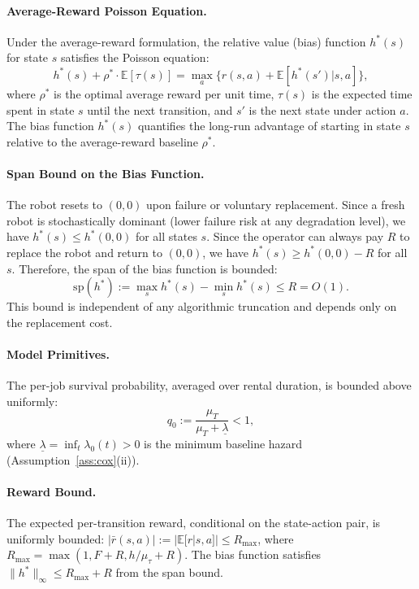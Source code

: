 \documentclass[letterpaper, 10 pt, conference]{IEEEconf}
\newcommand{\E}{\mathbb{E}}
\begin{document}
\paragraph{Average-Reward Poisson Equation.}
Under the average-reward formulation, the relative value (bias) function $h^*(s)$ for state $s$ satisfies the Poisson equation:
\begin{equation}
    \label{eq:poisson}
    h^*(s) + \rho^* \cdot \E[\tau(s)] = \max_a\Big\{r(s,a) + \E[h^*(s')|s,a]\Big\},
\end{equation}
where $\rho^*$ is the optimal average reward per unit time, $\tau(s)$ is the expected time spent in state $s$ until the next transition, and $s'$ is the next state under action $a$. The bias function $h^*(s)$ quantifies the long-run advantage of starting in state $s$ relative to the average-reward baseline $\rho^*$.

\paragraph{Span Bound on the Bias Function.}
The robot resets to $(0,0)$ upon failure or voluntary replacement. Since a fresh robot is stochastically dominant (lower failure risk at any degradation level), we have $h^*(s) \leq h^*(0,0)$ for all states $s$. Since the operator can always pay $R$ to replace the robot and return to $(0,0)$, we have $h^*(s) \geq h^*(0,0) - R$ for all $s$. Therefore, the span of the bias function is bounded:
\begin{equation}
    \label{eq:span_bound}
    \mathrm{sp}(h^*) := \max_s h^*(s) - \min_s h^*(s) \leq R = O(1).
\end{equation}
This bound is independent of any algorithmic truncation and depends only on the replacement cost.

\paragraph{Model Primitives.}
The per-job survival probability, averaged over rental duration, is bounded above uniformly:
\begin{equation}
    \label{eq:q0_def}
    q_0 := \frac{\mu_T}{\mu_T + \underline{\lambda}} < 1,
\end{equation}
where $\underline{\lambda} = \inf_t \lambda_0(t) > 0$ is the minimum baseline hazard (Assumption~\ref{ass:cox}(ii)).

\paragraph{Reward Bound.}
The expected per-transition reward, conditional on the state-action pair, is uniformly bounded: $|\bar{r}(s,a)| := |\E[r|s,a]| \leq R_{\max}$, where $R_{\max} = \max(1, F+R, h/\mu_\tau + R)$. The bias function satisfies $\|h^*\|_\infty \leq R_{\max} + R$ from the span bound.
\end{document}
